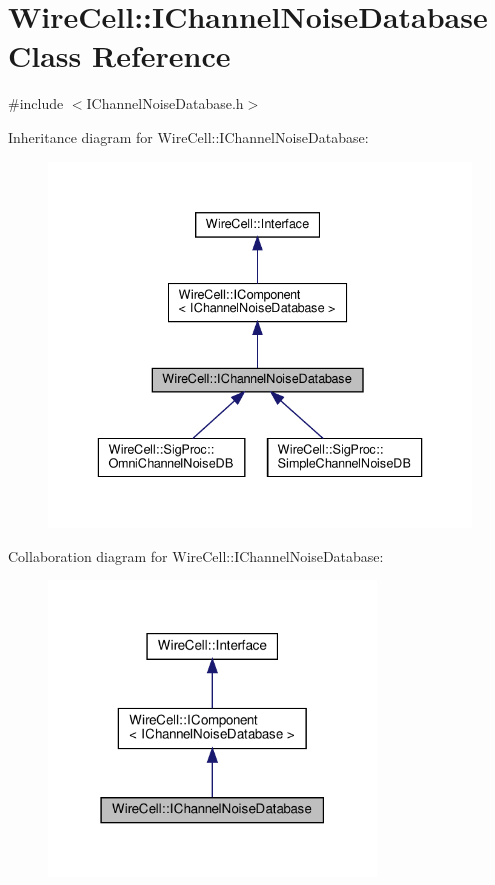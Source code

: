 \hypertarget{class_wire_cell_1_1_i_channel_noise_database}{}\section{Wire\+Cell\+:\+:I\+Channel\+Noise\+Database Class Reference}
\label{class_wire_cell_1_1_i_channel_noise_database}


{\ttfamily \#include $<$I\+Channel\+Noise\+Database.\+h$>$}



Inheritance diagram for Wire\+Cell\+:\+:I\+Channel\+Noise\+Database\+:
\nopagebreak
\begin{figure}[H]
\begin{center}
\leavevmode
\includegraphics[width=336pt]{class_wire_cell_1_1_i_channel_noise_database__inherit__graph}
\end{center}
\end{figure}


Collaboration diagram for Wire\+Cell\+:\+:I\+Channel\+Noise\+Database\+:
\nopagebreak
\begin{figure}[H]
\begin{center}
\leavevmode
\includegraphics[width=247pt]{class_wire_cell_1_1_i_channel_noise_database__coll__graph}
\end{center}
\end{figure}
